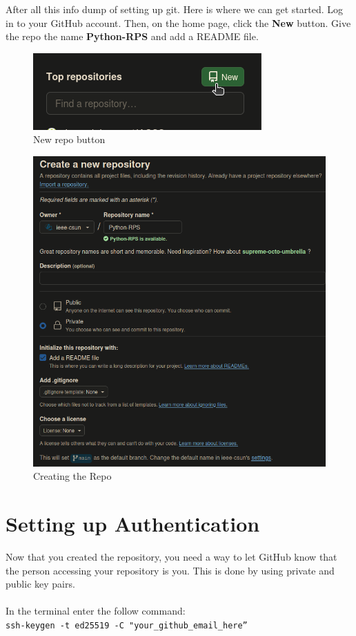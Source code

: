 \documentclass[12pt, a4paper]{article}
\begin{document}
After all this info dump of setting up git. Here is where we can get started. Log in to your GitHub account. Then, on the home page, click the \textbf{New} button. Give the repo the name \textbf{Python-RPS} and add a README file.
\begin{figure}[H]
\centering
\includegraphics[scale=0.5]{../images/workshop-I/GH-new-repo.png}
\caption{New repo button}
\end{figure}
\begin{figure}[H]
\centering
\includegraphics[scale=0.5]{../images/workshop-I/GH-create-repo.png}
\caption{Creating the Repo}
\end{figure}
\section{Setting up Authentication}

Now that you created the repository, you need a way to let GitHub know that the person accessing your repository is you. This is done by using private and public key pairs. \\\\
In the terminal enter the follow command:\\
\texttt{ssh-keygen -t ed25519 -C "your\_github\_email\_here”}\\
\end{document}

